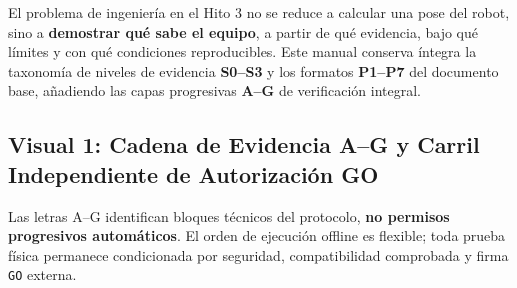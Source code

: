 \documentclass[10pt, a4paper]{article}
\begin{document}
El problema de ingeniería en el Hito 3 no se reduce a calcular una pose del robot, sino a \textbf{demostrar qué sabe el equipo}, a partir de qué evidencia, bajo qué límites y con qué condiciones reproducibles. Este manual conserva íntegra la taxonomía de niveles de evidencia \textbf{S0–S3} y los formatos \textbf{P1–P7} del documento base, añadiendo las capas progresivas \textbf{A–G} de verificación integral.

\subsection{Visual 1: Cadena de Evidencia A–G y Carril Independiente de Autorización GO}
Las letras A–G identifican bloques técnicos del protocolo, \textbf{no permisos progresivos automáticos}. El orden de ejecución offline es flexible; toda prueba física permanece condicionada por seguridad, compatibilidad comprobada y firma \texttt{GO} externa.
\end{document}
